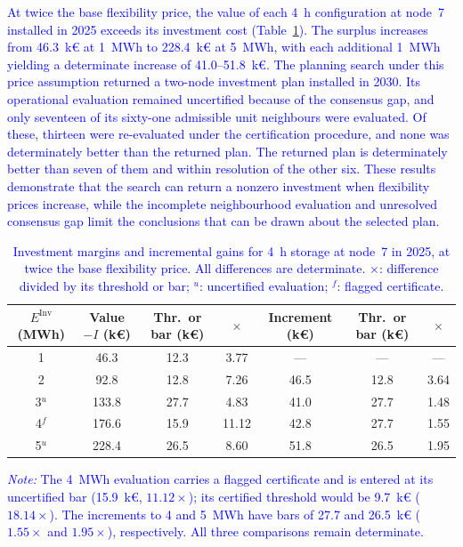 \documentclass[preprint,12pt]{elsarticle}
\begin{document}
\textcolor{blue}{
    At twice the base flexibility price, the value of each 4~h configuration at node~7 installed in 2025 exceeds its investment cost (Table~\ref{tab:res_energy_ladder_m2}). The surplus increases from 46.3~k\euro{} at 1~MWh to 228.4~k\euro{} at 5~MWh, with each additional 1~MWh yielding a determinate increase of 41.0--51.8~k\euro{}. The planning search under this price assumption returned a two-node investment plan installed in 2030. Its operational evaluation remained uncertified because of the consensus gap, and only seventeen of its sixty-one admissible unit neighbours were evaluated. Of these, thirteen were re-evaluated under the certification procedure, and none was determinately better than the returned plan. The returned plan is determinately better than seven of them and within resolution of the other six.
    These results demonstrate that the search can return a nonzero investment when flexibility prices increase, while the incomplete neighbourhood evaluation and unresolved consensus gap limit the conclusions that can be drawn about the selected plan.
}

\begin{table}[htbp!]
    \centering
    \caption{\textcolor{blue}{Investment margins and incremental gains for 4~h storage at node~7 in 2025, at twice the base flexibility price. All differences are determinate. $\times$: difference divided by its threshold or bar; $^{u}$: uncertified evaluation; $^{f}$: flagged certificate.}}
    \label{tab:res_energy_ladder_m2}
    \scriptsize\setlength{\tabcolsep}{4pt}
    \begin{tabular}{c c c c c c c}
        \toprule
        $E^{\text{Inv}}$ (MWh) & Value $- I$ (k\euro) & Thr.\ or bar (k\euro) & $\times$ & Increment (k\euro) & Thr.\ or bar (k\euro) & $\times$ \\
        \midrule
        1         & 46.3  & 12.3 & 3.77  & ---  & ---  & ---  \\
        2         & 92.8  & 12.8 & 7.26  & 46.5 & 12.8 & 3.64 \\
        3$^{u}$   & 133.8 & 27.7 & 4.83  & 41.0 & 27.7 & 1.48 \\
        4$^{f}$   & 176.6 & 15.9 & 11.12 & 42.8 & 27.7 & 1.55 \\
        5$^{u}$   & 228.4 & 26.5 & 8.60  & 51.8 & 26.5 & 1.95 \\
        \bottomrule
    \end{tabular}
    \par\smallskip
    \begin{minipage}{\linewidth}
        \scriptsize
        \raggedright
        \textcolor{blue}{%
            \textit{Note:} The 4~MWh evaluation carries a flagged certificate and is entered at its uncertified bar (15.9~k\euro{}, $11.12\times$); its certified threshold would be 9.7~k\euro{} ($18.14\times$).
            The increments to 4 and 5~MWh have bars of 27.7 and 26.5~k\euro{} ($1.55\times$ and $1.95\times$), respectively. All three comparisons remain determinate.
        }
    \end{minipage}
\end{table}
\end{document}
